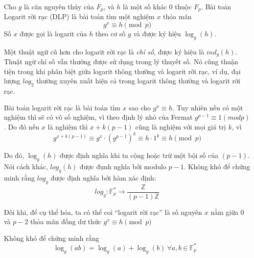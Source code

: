 \begin{definition}
	Cho $g$ là căn nguyên thủy của $F_p$, và $h$ là một số khác 0 thuộc $F_p$. Bài toán Logarit rời rạc (DLP) là bài toán tìm một nghiệm $x$ thỏa mãn
	$$ g^x \equiv h \pmod{p} $$
	Số $x$ được gọi là logarit của $h$ theo cơ số $g$ và được ký hiệu $\log_g(h)$.
\end{definition}

\begin{remark}
	Một thuật ngữ cũ hơn cho logarit rời rạc là \textit{chỉ số}, được ký hiệu là
	$ind_g(h)$. Thuật ngữ chỉ số vẫn thường được sử dụng trong lý thuyết số. Nó cũng
	thuận tiện trong khi phân biệt giữa logarit thông thường và logarit rời rạc, ví dụ, đại
	lượng $log_2$ thường xuyên xuất hiện cả trong logarit thông thường và logarit rời rạc.
\end{remark}

\begin{remark}
	\label{rm:2.2}
	Bài toán logarit rời rạc là bài toán tìm $x$ sao cho $g^x \equiv h$. Tuy nhiên nếu
	có một nghiệm thì sẽ có vô số nghiệm, vì theo định lý nhỏ của Fermat $g^{p-1} \equiv 1(mod p)$. Do đó nếu $x$ là nghiệm thì $x + k(p-1)$ cũng là nghiệm với mọi giá trị $k$, vì
	$$ g^{x + k(p-1)} \equiv g^x \cdot (g^{p-1})^k \equiv h  \cdot 1^k \equiv h \pmod{p} $$
\end{remark}
Do đó, $\log_g(h)$ được định nghĩa khi ta cộng hoặc trừ một bội số của $(p-1)$. Nói
cách khác, $log_g(h)$ được đụnh nghĩa bởi modulo $p-1$. Không khó để chứng minh
rằng $log_g$ được định nghĩa bởi hàm xác định:
$$ log_g: \mathbb{F}^*_p \rightarrow \frac{\mathbb{Z}}{(p-1)\mathbb{Z}} $$

Đôi khi, để cụ thể hóa, ta có thể coi  ``logarit rời rạc'' là số nguyên $x$ nằm giữa $0$ và $p - 2$ thỏa mãn đồng
dư thức $g^x \equiv h \pmod{p}$

\begin{remark}
	Không khó để chứng minh rằng
	$$ \log_g(ab) = \log_g(a) + \log_g(b) \ \text{$\forall a, b \in \mathbb{F}^*_p$ } $$
\end{remark}


